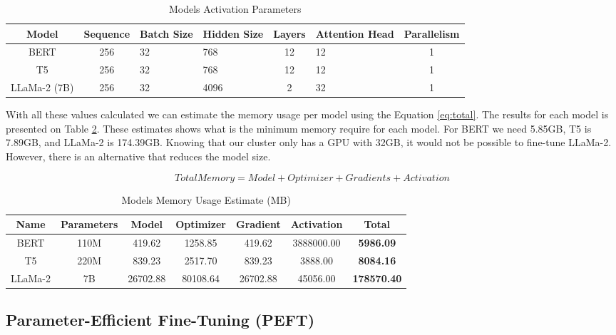 \begin{table}[H]
	\centering
	\caption{Models Activation Parameters}
	\begin{tabular}{||c | c | p{1.5cm} | p{1.5cm} | c | p{2cm} | c||} 
		\hline
		\textbf{Model} & \textbf{Sequence} & \textbf{Batch Size} & \textbf{Hidden Size} & \textbf{Layers} & \textbf{Attention Head} & \textbf{Parallelism} \\ [1ex] 
		\hline
		BERT & 256 & 32 & 768 & 12 & 12 & 1 \\ [1ex]
		\hline
		T5 & 256 & 32 & 768 & 12 & 12 & 1  \\[1ex]
		\hline
		LLaMa-2 (7B) & 256 & 32 & 4096 & 2 & 32 & 1  \\[1ex]
		\hline
	\end{tabular}
	\label{table:ModelActivation}
\end{table}


With all these values calculated we can estimate the memory usage per model using the Equation \ref{eq:total}. The results for each model is presented on Table \ref{table:MemoryUsage}. These estimates shows what is the minimum memory require for each model. For BERT we need 5.85GB, T5 is 7.89GB, and LLaMa-2 is 174.39GB. Knowing that our cluster only has a GPU with 32GB, it would not be possible to fine-tune LLaMa-2. However, there is an alternative that reduces the model size. 
	
\[ Total Memory = Model + Optimizer + Gradients + Activation \label{eq:total} \tag{5} \] 

\begin{table}[H]
	\centering
	\caption{Models Memory Usage Estimate (MB)}
	\begin{tabular}{||c | c | c | c | c | c | c||} 
		\hline
		\textbf{Name} & \textbf{Parameters} & \textbf{Model} & \textbf{Optimizer} & \textbf{Gradient} & \textbf{Activation} & \textbf{Total} \\ [1ex] 
		\hline
		BERT & 110M & 419.62 & 1258.85 & 419.62 & 3888000.00 & \textbf{5986.09} \\ [1ex]
		\hline
		T5 & 220M & 839.23 & 2517.70 & 839.23 & 3888.00 & \textbf{8084.16}  \\[1ex]
		\hline
		LLaMa-2 & 7B & 26702.88 & 80108.64 & 26702.88 & 45056.00 & \textbf{178570.40}  \\[1ex]
		\hline
	\end{tabular}
	\label{table:MemoryUsage}
\end{table}

\subsection{Parameter-Efficient Fine-Tuning (PEFT)}


